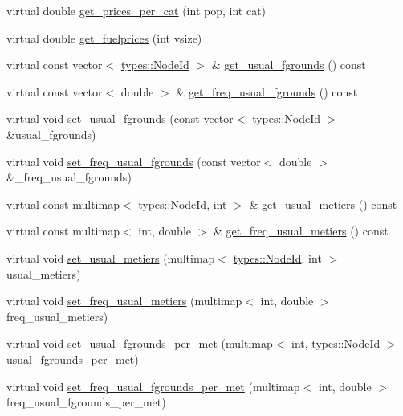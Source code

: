 \begin{DoxyCompactItemize}
\item 
virtual double \mbox{\hyperlink{class_node_ab6ef20b380f13109c31d1e4635c1c100}{get\+\_\+prices\+\_\+per\+\_\+cat}} (int pop, int cat)
\item 
virtual double \mbox{\hyperlink{class_node_ae9b986333df35cc09864019209dbef88}{get\+\_\+fuelprices}} (int vsize)
\item 
virtual const vector$<$ \mbox{\hyperlink{classtypes_1_1_node_id}{types\+::\+Node\+Id}} $>$ \& \mbox{\hyperlink{class_node_ac1c3ddd1751f913d42655888b7bbc24f}{get\+\_\+usual\+\_\+fgrounds}} () const
\item 
virtual const vector$<$ double $>$ \& \mbox{\hyperlink{class_node_a37fdbc3ddd2cd48c49d196a14c0740b4}{get\+\_\+freq\+\_\+usual\+\_\+fgrounds}} () const
\item 
virtual void \mbox{\hyperlink{class_node_af8df7f4ea7508b5fc9188af822ba363d}{set\+\_\+usual\+\_\+fgrounds}} (const vector$<$ \mbox{\hyperlink{classtypes_1_1_node_id}{types\+::\+Node\+Id}} $>$ \&usual\+\_\+fgrounds)
\item 
virtual void \mbox{\hyperlink{class_node_a89f4c8cc73721328fb2148136b713fd0}{set\+\_\+freq\+\_\+usual\+\_\+fgrounds}} (const vector$<$ double $>$ \&\+\_\+freq\+\_\+usual\+\_\+fgrounds)
\item 
virtual const multimap$<$ \mbox{\hyperlink{classtypes_1_1_node_id}{types\+::\+Node\+Id}}, int $>$ \& \mbox{\hyperlink{class_node_aab0fed01a893726033107dd46ccadcb8}{get\+\_\+usual\+\_\+metiers}} () const
\item 
virtual const multimap$<$ int, double $>$ \& \mbox{\hyperlink{class_node_a28923d8314c4f43a9df9a74216bff48a}{get\+\_\+freq\+\_\+usual\+\_\+metiers}} () const
\item 
virtual void \mbox{\hyperlink{class_node_ad2630b68ea7d53b00c47a5ea1d6e4662}{set\+\_\+usual\+\_\+metiers}} (multimap$<$ \mbox{\hyperlink{classtypes_1_1_node_id}{types\+::\+Node\+Id}}, int $>$ usual\+\_\+metiers)
\item 
virtual void \mbox{\hyperlink{class_node_a7f782a14dbabf4b50a30a89e3d686869}{set\+\_\+freq\+\_\+usual\+\_\+metiers}} (multimap$<$ int, double $>$ freq\+\_\+usual\+\_\+metiers)
\item 
virtual void \mbox{\hyperlink{class_node_ac9a4b300de4e64d3f4188ce543e80fbe}{set\+\_\+usual\+\_\+fgrounds\+\_\+per\+\_\+met}} (multimap$<$ int, \mbox{\hyperlink{classtypes_1_1_node_id}{types\+::\+Node\+Id}} $>$ usual\+\_\+fgrounds\+\_\+per\+\_\+met)
\item 
virtual void \mbox{\hyperlink{class_node_af7f54afbacab1aae936436ea2ee029f0}{set\+\_\+freq\+\_\+usual\+\_\+fgrounds\+\_\+per\+\_\+met}} (multimap$<$ int, double $>$ freq\+\_\+usual\+\_\+fgrounds\+\_\+per\+\_\+met)

\end{DoxyCompactItemize}
